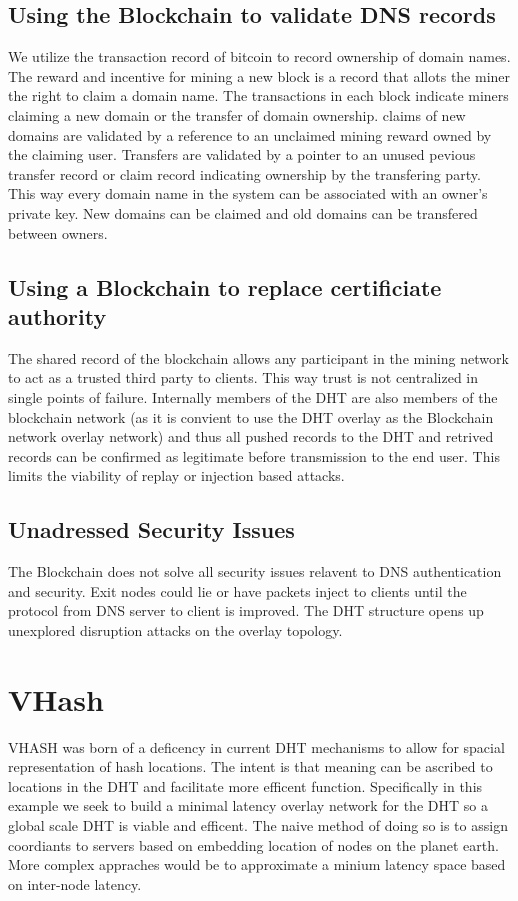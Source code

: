 \documentclass[11pt]{IEEEtran} %
\begin{document}
\subsection{Using the Blockchain to validate DNS records}
We utilize the transaction record of bitcoin to record ownership of domain names. The reward and incentive for mining a new block is a record that allots the miner the right to claim a domain name. The transactions in each block indicate miners claiming a new domain or the transfer of domain ownership. claims of new domains are validated by a reference to an unclaimed mining reward owned by the claiming user. Transfers are validated by a pointer to an unused pevious transfer record or claim record indicating ownership by the transfering party. This way every domain name in the system can be associated with an owner's private key. New domains can be claimed and old domains can be transfered between owners.

\subsection{Using a Blockchain to replace certificiate authority}
The shared record of the blockchain allows any participant in the mining network to act as a trusted third party to clients. This way trust is not centralized in single points of failure. Internally members of the DHT are also members of the blockchain network (as it is convient to use the DHT overlay as the Blockchain network overlay network) and thus all pushed records to the DHT and retrived records can be confirmed as legitimate before transmission to the end user. This limits the viability of replay or injection based attacks.

\subsection{Unadressed Security Issues}
The Blockchain does not solve all security issues relavent to DNS authentication and security. Exit nodes could lie or have packets inject to clients until the protocol from DNS server to client is improved. The DHT structure opens up unexplored disruption attacks on the overlay topology.

\section{VHash}
VHASH was born of a deficency in current DHT mechanisms to allow for spacial representation of hash locations. The intent is that meaning can be ascribed to locations in the DHT and facilitate more efficent function. Specifically in this example we seek to build a minimal latency overlay network for the DHT so a global scale DHT is viable and efficent. The naive method of doing so is to assign coordiants to servers based on embedding location of nodes on the planet earth. More complex appraches would be to approximate a minium latency space based on inter-node latency.
\end{document}
